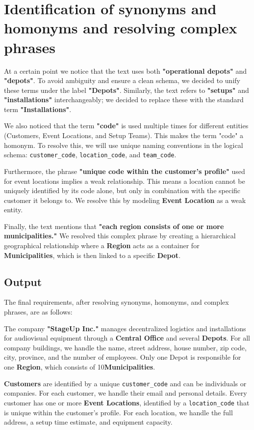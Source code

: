 \documentclass[12pt,a4paper]{article}
\begin{document}
\section{Identification of synonyms and homonyms and resolving complex phrases}

At a certain point we notice that the text uses both \textbf{"operational depots"} and \textbf{"depots"}. To avoid ambiguity and ensure a clean schema, we decided to unify these terms under the label \textbf{"Depots"}. Similarly, the text refers to \textbf{"setups"} and \textbf{"installations"} interchangeably; we decided to replace these with the standard term \textbf{"Installations"}.

We also noticed that the term \textbf{"code"} is used multiple times for different entities (Customers, Event Locations, and Setup Teams). This makes the term "code" a homonym. To resolve this, we will use unique naming conventions in the logical schema: \texttt{customer\_code}, \texttt{location\_code}, and \texttt{team\_code}.

Furthermore, the phrase \textbf{"unique code within the customer's profile"} used for event locations implies a weak relationship. This means a location cannot be uniquely identified by its code alone, but only in combination with the specific customer it belongs to. We resolve this by modeling \textbf{Event Location} as a weak entity.

Finally, the text mentions that \textbf{"each region consists of one or more municipalities."} We resolved this complex phrase by creating a hierarchical geographical relationship where a \textbf{Region} acts as a container for \textbf{Municipalities}, which is then linked to a specific \textbf{Depot}.

\subsection{Output}
The final requirements, after resolving synonyms, homonyms, and complex phrases, are as follows:

The company \textbf{"StageUp Inc."} manages decentralized logistics and installations for audiovisual equipment through a \textbf{Central Office} and several \textbf{Depots}. For all company buildings, we handle the name, street address, house number, zip code, city, province, and the number of employees. Only one Depot is responsible for one \textbf{Region}, which consists of 10\textbf{Municipalities}.

\textbf{Customers} are identified by a unique \texttt{customer\_code} and can be individuals or companies. For each customer, we handle their email and personal details. Every customer has one or more \textbf{Event Locations}, identified by a \texttt{location\_code} that is unique within the customer's profile. For each location, we handle the full address, a setup time estimate, and equipment capacity.
\end{document}
